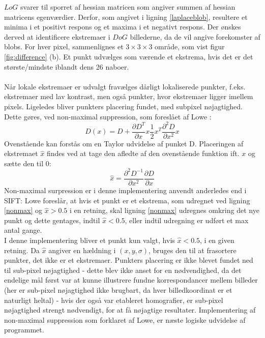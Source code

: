 $LoG$ svarer til sporret af hessian matricen som angiver summen af hessian matricens egenværdier. Derfor, som angivet i ligning \eqref{laplaceblob}, resultere et minima i et positivt respons og et maxima i et negativt respons. Der ønskes derved at identificere ekstremaer i $DoG$ billederne, da de vil angive forekomster af blobs. For hver pixel, sammenlignes et $3\times3\times3$ område, som vist figur \ref{fig:difference} (b). Et punkt udvælges som værende et ekstrema, hvis det er det største/mindste iblandt dens 26 naboer.
\\
\\
Når lokale ekstremaer er udvalgt fravælges dårligt lokaliserede punkter, f.eks. ekstremaer med lav kontrast, men også punkter, hvor ekstremaer ligger imellem pixels. Ligeledes bliver punkters placering fundet, med subpixel nøjagtighed. Dette gøres, ved non-maximal suppression, som foreslået af Lowe \cite{nonmaximalsuppression}:
\begin{equation}
D(x)=D+\dfrac{\partial D^T}{\partial x}x\dfrac{1}{2}x^T\dfrac{\partial^2D}{\partial x^2}x
\label{nonmax}
\end{equation}
Ovenstående kan forstås om en Taylor udvidelse af punket D.
Placeringen af ekstremaet $\hat{x}$ findes ved at tage den afledte af den ovenstående funktion ift. $x$ og sætte den til 0:
\begin{equation}
\hat{x}= \dfrac{\partial^2 D^{-1}}{\partial x^2}\dfrac{\partial D}{\partial x}
\label{xhat}
\end{equation}
Non-maximal surpression er i denne implementering anvendt anderledes end i SIFT: Lowe foreslår, at hvis et punkt er et ekstrema, som udregnet ved ligning \eqref{nonmax} og $\hat{x} > 0.5$ i en retning, skal ligning \eqref{nonmax} udregnes omkring det nye punkt og dette gentages, indtil $\hat{x} < 0.5$, eller indtil udregning er udført et max antal gange.
\\
I denne implementering bliver et punkt kun valgt, hvis $\hat{x} < 0.5$, i en given retning. Da $\hat{x}$ angiver en hældning i $(x, y, \sigma)$, bruges den til at frasortere punkter, det ikke er et ekstremaer. Punkters placering er ikke blevet fundet ned til sub-pixel nøjagtighed - dette blev ikke anset for en nødvendighed, da det endelige mål først var at kunne illustrere fundne korrespondancer mellem billeder (her er sub-pixel nøjagtighed ikke brugbart, da hver billedkoordinat er et naturligt heltal) - hvis der også var etableret homografier, er sub-pixel nøjagtighed strengt nødvendigt, for at få nøjagtige resultater. Implementering af non-maximal suppression som forklaret af Lowe, er næste logiske udvidelse af programmet. 
